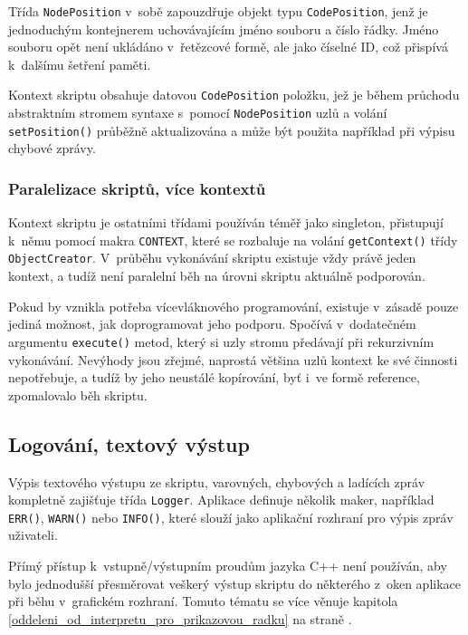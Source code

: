 \documentclass[11pt,twoside,a4paper]{book}
\begin{document}
Třída \texttt{NodePosition} v~sobě zapouzdřuje objekt typu \texttt{CodePosition}, jenž je jednoduchým kontejnerem uchovávajícím jméno souboru a číslo řádky. Jméno souboru opět není ukládáno v~řetězcové formě, ale jako číselné ID, což přispívá k~dalšímu šetření paměti.

Kontext skriptu obsahuje datovou \texttt{CodePosition} položku, jež je během průchodu abs\-trakt\-ním stromem syntaxe s~pomocí \texttt{NodePosition} uzlů a volání \texttt{setPosition()} průběžně aktualizována a může být použita například při výpisu chybové zprávy.


\subsubsection{Paralelizace skriptů, více kontextů}

Kontext skriptu je ostatními třídami používán téměř jako singleton, přistupují k~němu pomocí makra \texttt{CONTEXT}, které se rozbaluje na volání \texttt{getContext()} třídy \texttt{ObjectCreator}. V~průběhu vykonávání skriptu existuje vždy právě jeden kontext, a tudíž není paralelní běh na úrovni skriptu aktuálně podporován.

Pokud by vznikla potřeba vícevláknového programování, existuje v~zásadě pouze jediná mož\-nost, jak doprogramovat jeho podporu. Spočívá v~dodatečném argumentu \texttt{execute()} metod, který si uzly stromu předávají při rekurzivním vykonávání. Nevýhody jsou zřejmé, naprostá většina uzlů kontext ke své činnosti nepotřebuje, a tudíž by jeho neustálé kopírování, byť i~ve formě reference, zpomalovalo běh skriptu.


\subsection{Logování, textový výstup}

Výpis textového výstupu ze skriptu, varovných, chybových a ladících zpráv kompletně za\-jiš\-ťu\-je třída \texttt{Logger}. Aplikace definuje několik maker, například \texttt{ERR()}, \texttt{WARN()} nebo \texttt{INFO()}, které slouží jako aplikační rozhraní pro výpis zpráv uživateli.

Přímý přístup k~vstupně/výstupním proudům jazyka C++ není používán, aby bylo jednodušší přesměrovat veškerý výstup skriptu do některého z~oken aplikace při běhu v~grafickém rozhraní. Tomuto tématu se více věnuje kapitola \ref{oddeleni_od_interpretu_pro_prikazovou_radku} na straně \pageref{oddeleni_od_interpretu_pro_prikazovou_radku}.
\end{document}

